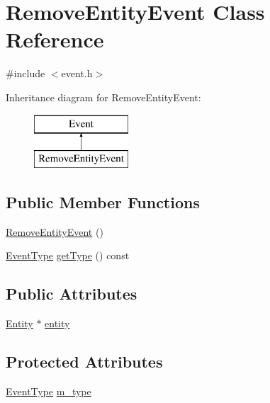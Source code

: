 \hypertarget{classRemoveEntityEvent}{\section{Remove\-Entity\-Event Class Reference}
\label{classRemoveEntityEvent}
}


{\ttfamily \#include $<$event.\-h$>$}

Inheritance diagram for Remove\-Entity\-Event\-:\begin{figure}[H]
\begin{center}
\leavevmode
\includegraphics[height=2.000000cm]{classRemoveEntityEvent}
\end{center}
\end{figure}
\subsection*{Public Member Functions}
\begin{DoxyCompactItemize}
\item 
\hyperlink{classRemoveEntityEvent_a81436e49e915dde130239bef999e09a8}{Remove\-Entity\-Event} ()
\item 
\hyperlink{event_8h_a2628ea8d12e8b2563c32f05dc7fff6fa}{Event\-Type} \hyperlink{classEvent_ab0c2e30730d5859851f3126258c0126e}{get\-Type} () const 
\end{DoxyCompactItemize}
\subsection*{Public Attributes}
\begin{DoxyCompactItemize}
\item 
\hyperlink{classEntity}{Entity} $\ast$ \hyperlink{classRemoveEntityEvent_ad2b1c7ba91298806b66d78a814882d2a}{entity}
\end{DoxyCompactItemize}
\subsection*{Protected Attributes}
\begin{DoxyCompactItemize}
\item 
\hyperlink{event_8h_a2628ea8d12e8b2563c32f05dc7fff6fa}{Event\-Type} \hyperlink{classEvent_a38264e3fb229dc64123dff1d5a7dcf9e}{m\-\_\-type}
\end{DoxyCompactItemize}



